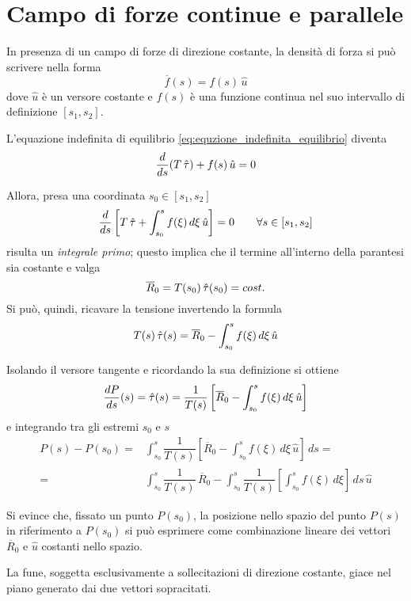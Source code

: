 \section{Campo di forze continue e parallele}\label{section:forze_continue_parallele}
In presenza di un campo di forze di direzione costante, la densità di forza si può scrivere nella forma
\[
\overline{f}(s)	= f(s)\,\hat{u}
\]
dove $\hat{u}$ è un versore costante e $f(s)$ è una funzione continua nel suo intervallo di definizione $[s_1, s_2]$.

L'equazione indefinita di equilibrio \eqref{eq:equzione_indefinita_equilibrio} diventa
\[
\dfrac{d}{ds}	(T\,\hat{\tau}) + f(s)\,\hat{u} = 0
\]

Allora, presa una coordinata $s_0 \in[s_1, s_2]$ 
\[
\dfrac{d}{ds}	\left[ T\,\hat{\tau} + \int_{s_0}^s f(\xi)\,d\xi\,\hat{u}\right] = 0\qquad \forall s\in[s_1, s_2]
\]
risulta un \emph{integrale primo}; questo implica che il termine all'interno della parantesi sia costante e valga
\[
\overline{R}_0 = T(s_0)	\,\hat{\tau}(s_0) = cost.
\]
 Si può, quindi, ricavare la tensione invertendo la formula
 \[
T(s)\,\hat{\tau}(s) = \overline{R}_0 - \int_{s_0}^s f(\xi)\,d\xi\,\hat{u}	 
 \]
 
 Isolando il versore tangente e ricordando la sua definizione si ottiene
 \[
\dfrac{dP}{ds}(s)	 = \hat{\tau} (s) = \dfrac{1}{T(s)}\left[\overline{R}_0 - \int_{s_0}^s f(\xi)\,d\xi\,\hat{u}\right]
 \]
e integrando tra gli estremi $s_0$ e $s$
\begin{align*}
P(s)	 - P(s_0) =& \int_{s_0}^s \dfrac{1}{T(s)}\left[\overline{R}_0 - \int_{s_0}^s f(\xi)\,d\xi\,\hat{u}\right]\,ds = \\
=& \int_{s_0}^s \dfrac{1}{T(s)}\,\overline{R}_0 - \int_{s_0}^s \dfrac{1}{T(s)}\left[\int_{s_0}^s f(\xi)\,d\xi\right]\,ds\,\hat{u}
\end{align*}

Si evince che, fissato un punto $P(s_0)$, la posizione nello spazio del punto $P(s)$ in riferimento a $P(s_0)$ si può esprimere come combinazione lineare dei vettori $\overline{R}_0$ e $\hat{u}$ costanti nello spazio.

La fune, soggetta esclusivamente a sollecitazioni di direzione costante, giace nel piano generato dai due vettori sopracitati.

